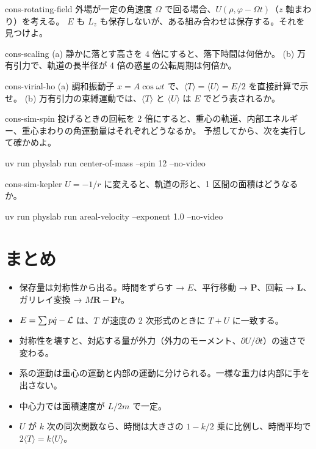 \begin{exercise}[応用]{cons-rotating-field}
外場が一定の角速度 $\Omega$ で回る場合、$U(\rho,\varphi-\Omega t)$（$z$ 軸まわり）を考える。
$E$ も $L_z$ も保存しないが、ある組み合わせは保存する。それを見つけよ。
\end{exercise}

\begin{exercise}[応用]{cons-scaling}
(a) 静かに落とす高さを 4 倍にすると、落下時間は何倍か。
(b) 万有引力で、軌道の長半径が 4 倍の惑星の公転周期は何倍か。
\end{exercise}

\begin{exercise}[応用]{cons-virial-ho}
(a) 調和振動子 $x=A\cos\omega t$ で、$\langle T\rangle=\langle U\rangle=E/2$ を直接計算で示せ。
(b) 万有引力の束縛運動では、$\langle T\rangle$ と $\langle U\rangle$ は $E$ でどう表されるか。
\end{exercise}

\begin{exercise}[シミュレーション]{cons-sim-spin}
投げるときの回転を 2 倍にすると、重心の軌道、内部エネルギー、重心まわりの角運動量はそれぞれどうなるか。
予想してから、次を実行して確かめよ。
\begin{terminal}
uv run physlab run center-of-mass --spin 12 --no-video
\end{terminal}
\end{exercise}

\begin{exercise}[シミュレーション]{cons-sim-kepler}
$U=-1/r$ に変えると、軌道の形と、1 区間の面積はどうなるか。
\begin{terminal}
uv run physlab run areal-velocity --exponent 1.0 --no-video
\end{terminal}
\end{exercise}

\section{まとめ}\label{sec:cons-summary}

\begin{summary}
\begin{itemize}
  \item 保存量は対称性から出る。時間をずらす → $E$、平行移動 → $\bm P$、回転 → $\bm L$、ガリレイ変換 → $M\bm R-\bm Pt$。
  \item $E=\sum p\dot q-\mathcal{L}$ は、$T$ が速度の 2 次形式のときに $T+U$ に一致する。
  \item 対称性を壊すと、対応する量が外力（外力のモーメント、$\partial U/\partial t$）の速さで変わる。
  \item 系の運動は重心の運動と内部の運動に分けられる。一様な重力は内部に手を出さない。
  \item 中心力では面積速度が $L/2m$ で一定。
  \item $U$ が $k$ 次の同次関数なら、時間は大きさの $1-k/2$ 乗に比例し、時間平均で $2\langle T\rangle=k\langle U\rangle$。
\end{itemize}
\end{summary}

